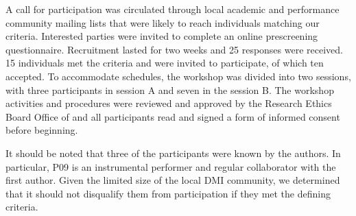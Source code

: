 \documentclass[letterpaper, 12pt]{article}
\begin{document}
A call for participation was circulated through local academic and performance community mailing lists that were likely to reach individuals matching our criteria. 
Interested parties were invited to complete an online prescreening questionnaire. Recruitment lasted for two weeks and 25 responses were received. 15 individuals met the criteria and were invited to participate, of which ten accepted. To accommodate schedules, the workshop was divided into two sessions, with three participants in session A and seven in the session B. 
The workshop activities and procedures were reviewed and approved by the Research Ethics Board Office of  and all participants read and signed a form of informed consent before beginning. 

It should be noted that three of the participants were known by the authors. In particular, P09 is an instrumental performer and regular collaborator with the first author. Given the limited size of the local DMI community, we determined that it should not disqualify them from participation if they met the defining criteria.
\end{document}
